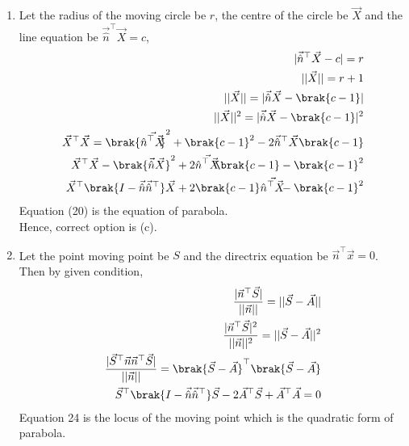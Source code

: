 \documentclass[journal]{IEEEtran}
\begin{document}
\begin{enumerate}
\item Let the radius of the moving circle be $r$, the centre of the circle be $\vec{X}$ and the line equation be $\vec{\hat{n}}^\top\vec{X}=c$,
\begin{align}
    |\vec{\hat{n}}^\top\vec{X}-c|=r\\
    ||\vec{X}||=r+1\\
    ||\vec{X}||=|\vec{\hat{n}}\vec{X}-\brak{c-1}|\\
    ||\vec{X}||^2=|\vec{\hat{n}}\vec{X}-\brak{c-1}|^2\\
    \vec{X}^\top\vec{X}=\brak{\vec{\hat{n}^\top\vec{X}}}^2+\brak{c-1}^2-2\vec{\hat{n}}^\top\vec{X}\brak{c-1}\\
    \vec{X}^\top\vec{X}-\brak{\vec{\hat{n}}\vec{X}}^2+2\vec{\hat{n}^\top\vec{X}}\brak{c-1}-\brak{c-1}^2\\
    \vec{X}^\top\brak{I-\vec{\hat{n}}\vec{\hat{n}}^\top}\vec{X}+2\brak{c-1}\vec{\hat{n}^\top\vec{X}}-\brak{c-1}^2
\end{align}
Equation (20) is the equation of parabola.\\
Hence, correct option is (c).

\item Let the point moving point be $S$ and the directrix equation be $\vec{n}^\top\vec{x}=0$.\\
Then by given condition,
\begin{align}
    \frac{|\vec{n}^\top\vec{S}|}{||\vec{n}||}=||\vec{S}-\vec{A}||\\
    \frac{|\vec{n}^\top\vec{S}|^2}{||\vec{n}||^2}=||\vec{S}-\vec{A}||^2\\
    \frac{|\vec{S}^\top\vec{n}\vec{n}^\top\vec{S}|}{||\vec{n}||}=\brak{\vec{S}-\vec{A}}^\top\brak{\vec{S}-\vec{A}}\\
    \vec{S}^\top\brak{I-\vec{\hat{n}}\vec{\hat{n}}^\top}\vec{S}-2\vec{A}^\top\vec{S}+\vec{A}^\top\vec{A}=0
\end{align}
Equation 24 is the locus of the moving point which is the quadratic form of parabola.\\



\end{enumerate}
\end{document}
